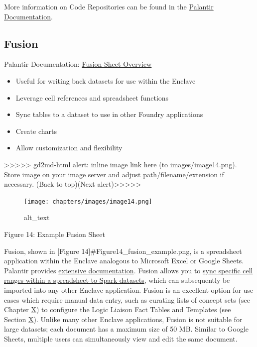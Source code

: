 \documentclass[
  letterpaper,
  DIV=11,
  numbers=noendperiod]{scrreprt}
\providecommand{\tightlist}{%
  \setlength{\itemsep}{0pt}\setlength{\parskip}{0pt}}\usepackage{longtable,booktabs,array}
\begin{document}
More information on Code Repositories can be found in the
\href{https://www.palantir.com/docs/foundry/code-repositories/overview/}{Palantir
Documentation}.

\hypertarget{fusion}{%
\subsection{Fusion}\label{fusion}}

Palantir Documentation:
\href{https://www.palantir.com/docs/foundry/fusion/overview/}{Fusion
Sheet Overview}

\begin{itemize}
\tightlist
\item
  Useful for writing back datasets for use within the Enclave
\item
  Leverage cell references and spreadsheet functions
\item
  Sync tables to a dataset to use in other Foundry applications
\item
  Create charts
\item
  Allow customization and flexibility
\end{itemize}

{\textgreater\textgreater\textgreater\textgreater\textgreater{}
gd2md-html alert: inline image link here (to images/image14.png). Store
image on your image server and adjust path/filename/extension if
necessary. }(Back to top)(Next
alert){\textgreater\textgreater\textgreater\textgreater\textgreater{} }

\begin{figure}

{\centering \texttt{[image: chapters/images/image14.png]}

}

\caption{alt\_text}

\end{figure}

Figure 14: Example Fusion Sheet

Fusion, shown in {[}Figure 14{]}\#Figure14\_fusion\_example.png, is a
spreadsheet application within the Enclave analogous to Microsoft Excel
or Google Sheets. Palantir provides
\href{https://www.palantir.com/docs/foundry/fusion/overview/}{extensive
documentation}. Fusion allows you to
\href{https://www.palantir.com/docs/foundry/fusion/sync-table-dataset/}{sync
specific cell ranges within a spreadsheet to Spark datasets}, which can
subsequently be imported into any other Enclave application. Fusion is
an excellent option for use cases which require manual data entry, such
as curating lists of concept sets (see Chapter
\protect\hyperlink{Understanding-the-Data}{X}) to configure the Logic
Liaison Fact Tables and Templates (see Section
\protect\hyperlink{N3C-Knowledge-Store}{X}). Unlike many other Enclave
applications, Fusion is not suitable for large datasets; each document
has a maximum size of 50 MB. Similar to Google Sheets, multiple users
can simultaneously view and edit the same document.
\end{document}
